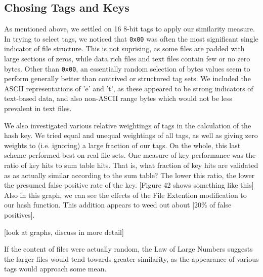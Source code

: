\documentclass[10pt, twocolumn]{article}
\begin{document}
\subsection{Chosing Tags and Keys}

As mentioned above, we settled on 16 8-bit tags to apply our similarity measure.  In trying to select tags, we noticed that {\tt 0x00} was often the most significant single indicator of file structure.  This is not suprising, as some files are padded with large sections of zeros, while data rich files and text files contain few or no zero bytes.  Other than {\tt 0x00}, an essentially random selection of bytes values seem to perform generally better than contrived or structured tag sets.  We included the ASCII representations of 'e' and 't', as these appeared to be strong indicators of text-based data, and also non-ASCII range bytes which would not be less prevalent in text files.

We also investigated various relative weightings of tags in the calculation of the hash key.  We tried equal and unequal weightings of all tags, as well as giving zero weights to (i.e. ignoring) a large fraction of our tags.  On the whole, this last scheme performed best on real file sets. One measure of key performance was the ratio of key hits to sum table hits.  That is, what fraction of key hits are validated as as actually similar according to the sum table?  The lower this ratio, the lower the presumed false positive rate of the key.  [Figure 42 shows something like this]  Also in this graph, we can see the effects of the File Extention modification to our hash function.  This addition appears to weed out about [20\% of false positives].


[look at graphs, discuss in more detail]







 If the content of files were actually random, the Law of Large Numbers suggests the larger files would tend towards greater similarity, as the appearance of various tags would approach some mean.  
\end{document}
